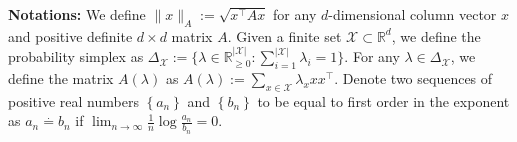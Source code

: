 \documentclass[accepted]{uai2025} %
\theoremstyle{plain}
\theoremstyle{definition}
\theoremstyle{remark}
\newcommand{\cbr}[1]{\left\{#1\right\}}
\begin{document}
\textbf{Notations: }We define $\lVert x \rVert_A:= \sqrt{  x^\top A x}$ for any $d$-dimensional column vector $x$ and positive definite $d \times d$ matrix $A$. Given a finite set $\mathcal{X} \subset \mathbb{R}^d$, we define the  probability simplex as 
$\Delta_{\mathcal{X}} := \big\{ \lambda \in \mathbb{R}_{\geq 0}^{|\mathcal{X}|} : \sum_{i=1}^{|\mathcal{X}|} \lambda_i = 1 \big\}.$ For any $\lambda \in \Delta_{\mathcal{X}}$, we define the matrix $A(\lambda)$ as $A(\lambda) := \sum_{x \in \mathcal{X}} \lambda_x x x^\top.$ Denote two sequences of positive real numbers $\cbr{a_n}$ and $\cbr{b_n}$ to be equal to first order in the exponent as   $a_n\stackrel{\cdot}{=}b_n$ if $\lim_{n\to \infty} \frac{1}{n}\log\frac{a_n}{b_n}=0$.
\end{document}
